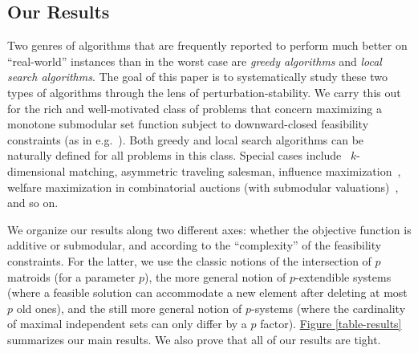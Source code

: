 \subsection{Our Results}

Two genres of algorithms that are frequently reported to perform much
better on ``real-world'' instances than in the worst case are {\em
  greedy algorithms} and {\em local search algorithms}.  The goal of
this paper is to systematically study these two types of algorithms
through the lens of perturbation-stability.  We carry this out for the
rich and well-motivated class of problems that concern maximizing a
monotone submodular set function subject to downward-closed
feasibility constraints (as in e.g.~\cite{lovasz1983submodular,
  nemhauser1978analysis, fisher1978analysis}).  Both greedy and local
search algorithms can be naturally defined for all problems in this
class.  Special cases include~\cite{mestre2006greedy} $k$-dimensional matching, asymmetric
traveling salesman, influence maximization~\cite{kempe2003maximizing},
welfare maximization in combinatorial auctions (with submodular
valuations)~\cite{lehmann2001combinatorial,vondrak2008optimal}, and so
on.

We organize our results along two different axes: whether the
objective function is additive or submodular, and according to the
``complexity'' of the feasibility constraints.  
For the latter, we use the classic notions of the intersection of
$p$ matroids (for a parameter $p$), the more general notion of
$p$-extendible systems (where a feasible solution can accommodate a
new element after deleting at most $p$ old ones), and the still
more general notion of $p$-systems (where the cardinality of maximal
independent sets can only differ by a $p$ factor).
\hyperref[table-results]{Figure \ref{table-results}} summarizes our main results.  
We also prove that all of our results are tight.

